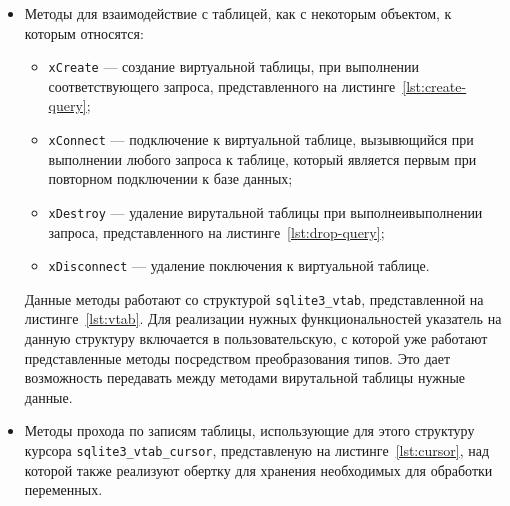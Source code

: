 \begin{itemize}
    \item Методы для взаимодействие с таблицей, как с некоторым объектом, к
        которым относятся:
        \begin{itemize}
            \item \texttt{xCreate} --- создание виртуальной таблицы, при
                выполнении соответствующего запроса, представленного на
                листинге~\ref{lst:create-query};

            {
            \captionsetup{format=hang,justification=raggedright,
                          singlelinecheck=off,width=16cm}
            }

            \item \texttt{xConnect} --- подключение к виртуальной таблице,
                вызывющийся при выполнении любого запроса к таблице, который
                является первым при повторном подключении к базе данных;
            \item \texttt{xDestroy} --- удаление вирутальной таблицы при
                выполнеивыполнении запроса, представленного на
                листинге~\ref{lst:drop-query};

            {
            \captionsetup{format=hang,justification=raggedright,
                          singlelinecheck=off,width=16cm}
            }

            \item \texttt{xDisconnect} --- удаление поключения к виртуальной
                таблице.
        \end{itemize}

    Данные методы работают со структурой \texttt{sqlite3\_vtab}, представленной
    на листинге~\ref{lst:vtab}. Для реализации нужных функциональностей
    указатель на данную структуру включается в пользовательскую, с которой уже
    работают представленные методы посредством преобразования типов. Это дает
    возможность передавать между методами вирутальной таблицы нужные данные.

    {
    \captionsetup{format=hang,justification=raggedright,
                  singlelinecheck=off,width=16cm}
    }

    \item Методы прохода по записям таблицы, использующие для этого структуру
        курсора \texttt{sqlite3\_vtab\_cursor}, представленую на
        листинге~\ref{lst:cursor}, над которой также реализуют обертку для
        хранения необходимых для обработки переменных.


\end{itemize}
